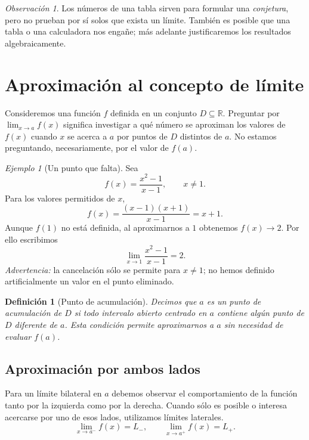 \documentclass[12pt]{article}
\newtheorem{definicion}{Definición}[section]
\theoremstyle{remark}
\newtheorem{observacion}{Observación}
\newtheorem{ejemplo}{Ejemplo}
\newcommand{\R}{\mathbb{R}}
\begin{document}
\begin{observacion}
Los números de una tabla sirven para formular una \emph{conjetura}, pero no prueban por sí solos que exista un límite. También es posible que una tabla o una calculadora nos engañe; más adelante justificaremos los resultados algebraicamente.
\end{observacion}

\section{Aproximación al concepto de límite}
Consideremos una función $f$ definida en un conjunto $D\subseteq\R$. Preguntar por $\lim_{x\to a}f(x)$ significa investigar a qué número se aproximan los valores de $f(x)$ cuando $x$ se acerca a $a$ por puntos de $D$ distintos de $a$. No estamos preguntando, necesariamente, por el valor de $f(a)$.

\begin{ejemplo}[Un punto que falta]
Sea
\[
f(x)=\frac{x^2-1}{x-1},\qquad x\ne 1.
\]
Para los valores permitidos de $x$,
\[
f(x)=\frac{(x-1)(x+1)}{x-1}=x+1.
\]
Aunque $f(1)$ no está definida, al aproximarnos a $1$ obtenemos $f(x)\to2$. Por ello escribimos
\[\boxed{\lim_{x\to1}\frac{x^2-1}{x-1}=2.}\]
\emph{Advertencia:} la cancelación sólo se permite para $x\ne1$; no hemos definido artificialmente un valor en el punto eliminado.
\end{ejemplo}

\begin{definicion}[Punto de acumulación]
Decimos que $a$ es un punto de acumulación de $D$ si todo intervalo abierto centrado en $a$ contiene algún punto de $D$ diferente de $a$. Esta condición permite aproximarnos a $a$ sin necesidad de evaluar $f(a)$.
\end{definicion}
\subsection*{Aproximación por ambos lados}
Para un límite bilateral en $a$ debemos observar el comportamiento de la función tanto por la izquierda como por la derecha. Cuando sólo es posible o interesa acercarse por uno de esos lados, utilizamos límites laterales.
\[
\lim_{x\to a^-} f(x)=L_-,\qquad
\lim_{x\to a^+} f(x)=L_+.
\]
\end{document}
